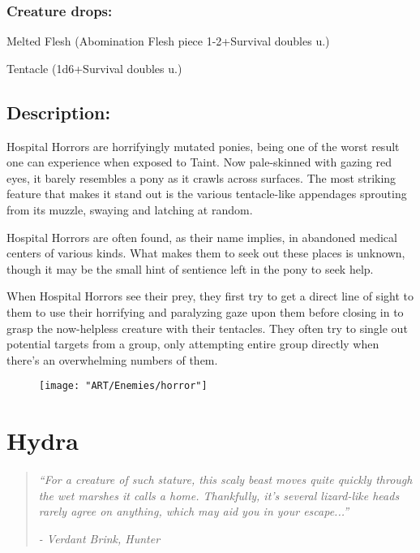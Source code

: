 \documentclass[11pt,a4paper,twocolumn]{book}
\begin{document}
	\subsubsection*{Creature drops:}
	\begin{compactitem}
		\item Melted Flesh (Abomination Flesh piece 1-2+Survival doubles u.)
		\item Tentacle (1d6+Survival doubles u.)
	\end{compactitem}
	
	\subsection*{Description:}
	Hospital Horrors are horrifyingly mutated ponies, being one of the worst result one can experience when exposed to Taint. Now pale-skinned with gazing red eyes, it barely resembles a pony as it crawls across surfaces. The most striking feature that makes it stand out is the various tentacle-like appendages sprouting from its muzzle, swaying and latching at random.
	
	Hospital Horrors are often found, as their name implies, in abandoned medical centers of various kinds. What makes them to seek out these places is unknown, though it may be the small hint of sentience left in the pony to seek help.
	
	When Hospital Horrors see their prey, they first try to get a direct line of sight to them to use their horrifying and paralyzing gaze upon them before closing in to grasp the now-helpless creature with their tentacles. They often try to single out potential targets from a group, only attempting entire group directly when there's an overwhelming numbers of them.
	
	\begin{figure}[h]
		\centering
		\texttt{[image: "ART/Enemies/horror"]}
	\end{figure}
	
	\clearpage
	
	\section*{Hydra}
	\begin{quote}
		\emph{``For a creature of such stature, this scaly beast moves quite quickly through the wet marshes it calls a home. Thankfully, it's several lizard-like heads rarely agree on anything, which may aid you in your escape...''}
		
		\emph{-	Verdant Brink, Hunter}
	\end{quote}
	
\end{document}
